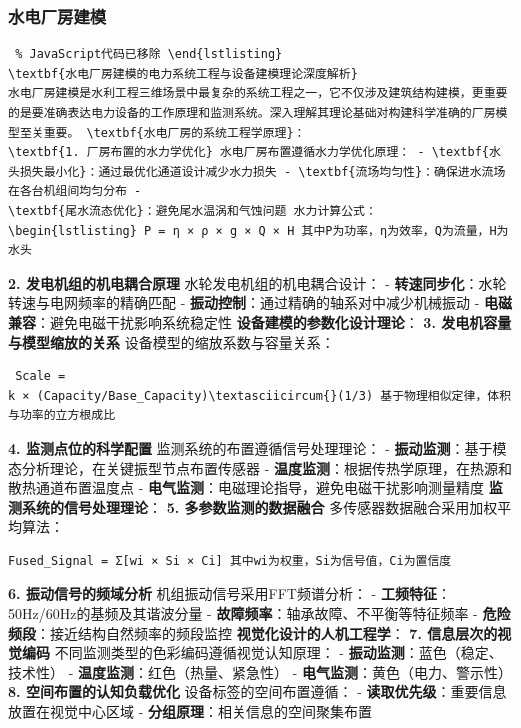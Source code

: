 \subsubsection{水电厂房建模}\label{ux6c34ux7535ux5382ux623fux5efaux6a21} \begin{lstlisting} % JavaScript代码已移除 \end{lstlisting}
\textbf{水电厂房建模的电力系统工程与设备建模理论深度解析}
水电厂房建模是水利工程三维场景中最复杂的系统工程之一，它不仅涉及建筑结构建模，更重要的是要准确表达电力设备的工作原理和监测系统。深入理解其理论基础对构建科学准确的厂房模型至关重要。 \textbf{水电厂房的系统工程学原理}：
\textbf{1. 厂房布置的水力学优化} 水电厂房布置遵循水力学优化原理： - \textbf{水头损失最小化}：通过最优化通道设计减少水力损失 - \textbf{流场均匀性}：确保进水流场在各台机组间均匀分布 -
\textbf{尾水流态优化}：避免尾水温涡和气蚀问题 水力计算公式： \begin{lstlisting} P = η × ρ × g × Q × H 其中P为功率，η为效率，Q为流量，H为水头 \end{lstlisting}
\textbf{2. 发电机组的机电耦合原理} 水轮发电机组的机电耦合设计： - \textbf{转速同步化}：水轮转速与电网频率的精确匹配 - \textbf{振动控制}：通过精确的轴系对中减少机械振动 -
\textbf{电磁兼容}：避免电磁干扰影响系统稳定性 \textbf{设备建模的参数化设计理论}： \textbf{3. 发电机容量与模型缩放的关系} 设备模型的缩放系数与容量关系： \begin{lstlisting} Scale =
k × (Capacity/Base_Capacity)\textasciicircum{}(1/3) 基于物理相似定律，体积与功率的立方根成比 \end{lstlisting} \textbf{4. 监测点位的科学配置}
监测系统的布置遵循信号处理理论： - \textbf{振动监测}：基于模态分析理论，在关键振型节点布置传感器 - \textbf{温度监测}：根据传热学原理，在热源和散热通道布置温度点 -
\textbf{电气监测}：电磁理论指导，避免电磁干扰影响测量精度 \textbf{监测系统的信号处理理论}： \textbf{5. 多参数监测的数据融合} 多传感器数据融合采用加权平均算法： \begin{lstlisting}
Fused_Signal = Σ[wi × Si × Ci] 其中wi为权重，Si为信号值，Ci为置信度 \end{lstlisting} \textbf{6. 振动信号的频域分析} 机组振动信号采用FFT频谱分析： -
\textbf{工频特征}：50Hz/60Hz的基频及其谐波分量 - \textbf{故障频率}：轴承故障、不平衡等特征频率 - \textbf{危险频段}：接近结构自然频率的频段监控 \textbf{视觉化设计的人机工程学}：
\textbf{7. 信息层次的视觉编码} 不同监测类型的色彩编码遵循视觉认知原理： - \textbf{振动监测}：蓝色（稳定、技术性） - \textbf{温度监测}：红色（热量、紧急性） -
\textbf{电气监测}：黄色（电力、警示性） \textbf{8. 空间布置的认知负载优化} 设备标签的空间布置遵循： - \textbf{读取优先级}：重要信息放置在视觉中心区域 - \textbf{分组原理}：相关信息的空间聚集布置
